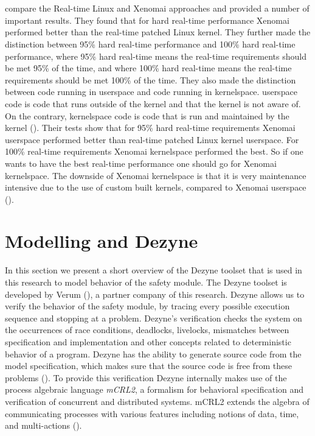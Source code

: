 \documentclass[12pt]{scrreprt}
\begin{document}
\\\\
\citeauthor{brown_martin} compare the Real-time Linux and Xenomai approaches and provided a number of important results. They found that for hard real-time performance Xenomai performed better than the real-time patched Linux kernel. They further made the distinction between 95\% hard real-time performance and 100\% hard real-time performance, where 95\% hard real-time means the real-time requirements should be met 95\% of the time, and where 100\% hard real-time means the real-time requirements should be met 100\% of the time. They also made the distinction between code running in userspace and code running in kernelspace. userspace code is code that runs outside of the kernel and that the kernel is not aware of. On the contrary, kernelspace code is code that is run and maintained by the kernel (\cite{blocking}). Their tests show that for 95\% hard real-time requirements Xenomai userspace performed better than real-time patched Linux kernel userspace. For 100\% real-time requirements Xenomai kernelspace performed the best. So if one wants to have the best real-time performance one should go for Xenomai kernelspace. The downside of Xenomai kernelspace is that it is very maintenance intensive due to the use of custom built kernels, compared to Xenomai userspace (\cite{brown_martin}).

\section{Modelling and Dezyne}
In this section we present a short overview of the Dezyne toolset that is used in this research to model behavior of the safety module. The Dezyne toolset is developed by Verum (\cite{verum}), a partner company of this research. Dezyne allows us to verify the behavior of the safety module, by tracing every possible execution sequence and stopping at a problem. Dezyne's verification checks the system on the occurrences of race conditions, deadlocks, livelocks, mismatches between specification and implementation and other concepts related to deterministic behavior of a program. Dezyne has the ability to generate source code from the model specification, which makes sure that the source code is free from these problems (\cite{dzntut}).
To provide this verification Dezyne internally makes use of the process algebraic language \textit{mCRL2}, a formalism for behavioral specification and verification of concurrent and distributed systems. mCRL2 extends the algebra of communicating processes with various features including notions of data, time, and multi-actions (\cite{mcrl2}).
\end{document}
